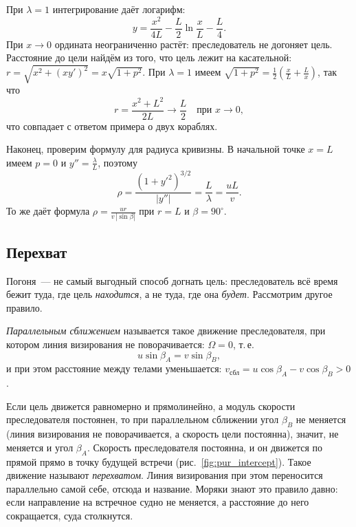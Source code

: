 \documentclass[../main.tex]{subfiles}
\begin{document}
При $\lambda = 1$ интегрирование даёт логарифм:
\[
y = \frac{x^2}{4L} - \frac{L}{2}\ln\frac{x}{L} - \frac{L}{4}.
\]
При $x \to 0$ ордината неограниченно растёт: преследователь не догоняет цель.
Расстояние до цели найдём из того, что цель лежит на касательной:
$r = \sqrt{x^2 + (xy')^2} = x\sqrt{1 + p^2}$. При $\lambda = 1$ имеем
$\sqrt{1 + p^2} = \frac{1}{2}\left(\frac{x}{L} + \frac{L}{x}\right)$, так что
\[
r = \frac{x^2 + L^2}{2L} \to \frac{L}{2} \quad\text{при } x \to 0,
\]
что совпадает с ответом примера о двух кораблях.

Наконец, проверим формулу для радиуса кривизны. В начальной точке $x = L$ имеем
$p = 0$ и $y'' = \frac{\lambda}{L}$, поэтому
\[
\rho = \frac{(1 + y'^2)^{3/2}}{|y''|} = \frac{L}{\lambda} = \frac{uL}{v}.
\]
То же даёт формула $\rho = \frac{ur}{v\,|\sin\beta|}$ при $r = L$ и $\beta = 90^\circ$.

\subsection{Перехват}

Погоня~--- не самый выгодный способ догнать цель: преследователь всё время бежит
туда, где цель \emph{находится}, а не туда, где она \emph{будет}. Рассмотрим другое
правило.

\begin{definition}
\textit{Параллельным сближением} называется такое движение преследователя, при
котором линия визирования не поворачивается: $\Omega = 0$, т.\,е.
\[
u\sin\beta_A = v\sin\beta_B,
\]
и при этом расстояние между телами уменьшается:
$v_{\text{сбл}} = u\cos\beta_A - v\cos\beta_B > 0$.
\end{definition}

Если цель движется равномерно и прямолинейно, а модуль скорости преследователя
постоянен, то при параллельном сближении угол $\beta_B$ не меняется (линия визирования
не поворачивается, а скорость цели постоянна), значит, не меняется и угол $\beta_A$.
Скорость преследователя постоянна, и он движется по прямой прямо в точку будущей
встречи (рис.~\ref{fig:pur_intercept}). Такое движение называют \textit{перехватом}.
Линия визирования при этом переносится параллельно самой себе, отсюда и название.
Моряки знают это правило давно: если направление на встречное судно не меняется, а
расстояние до него сокращается, суда столкнутся.
\end{document}

